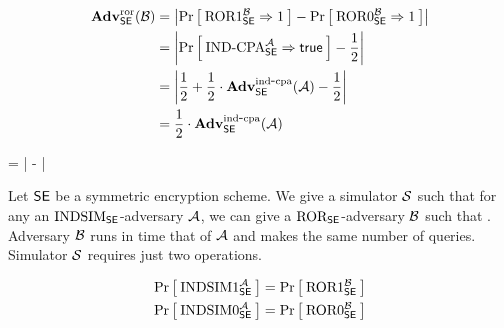 \begin{align*}
\AdvROR{\SE}{\advB} 
    &= \left|\Prob{\ROR1_\SE^\advB\Rightarrow 1} -
                                \Prob{\ROR0_\SE^\advB\Rightarrow 1}\right|\\
    &= \left|\Prob{\INDCPA_\SE^\advA\Rightarrow\true} - \frac{1}{2}\right|\\
    &= \left|\frac{1}{2} +
    \frac{1}{2}\cdot\AdvINDCPA{\SE}{\advA} - \frac{1}{2}\right|\\
    &= \frac{1}{2}\cdot\AdvINDCPA{\SE}{\advA}
\end{align*}




\bnm
\AdvINDSIM{\SE,\simu}{\advA} = 
    \left| -  \right| 
\enm

\begin{theorem*}
Let $\SE$ be a symmetric encryption scheme. We give a simulator $\simu$ such
that for any  an
$\INDSIM_\SE$-adversary $\advA$, we can give 
a $\ROR_\SE$-adversary $\advB$ such that
\bnm
  \AdvINDSIM{\SE,\simu}{\advA} \le \AdvROR{\SE}{\advB} \;.
\enm
Adversary $\advB$ runs in time that of $\advA$ and makes the same number of
queries. Simulator $\simu$ requires just two operations.
\end{theorem*}

\begin{align*}
  \Prob{\INDSIM1_{\SE}^\advA} &= \Prob{\ROR1_{\SE}^\advB}\\ 
  \Prob{\INDSIM0_{\SE}^\advA} &= \Prob{\ROR0_{\SE}^\advB} 
\end{align*}


